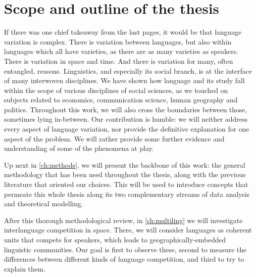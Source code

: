 \documentclass[../thesis.tex]{subfiles}
\begin{document}



\section{Scope and outline of the thesis}
If there was one chief takeaway from the last pages, it would be that language variation
is complex. There is variation between languages, but also within languages which all
have varieties, as there are as many varieties as speakers. There is variation in space
and time. And there is variation for many, often entangled, reasons. Linguistics, and
especially its social branch, is at the interface of many interwoven
disciplines. We have shown how language and its study fall within the scope of various
disciplines of social sciences, as we touched on subjects related to economics,
communication science, human geography and politics. Throughout this work, we will also
cross the boundaries between those, sometimes lying in-between. Our contribution is
humble: we will neither address every aspect of language variation,
nor provide the definitive explanation for one aspect of the problem. We will rather
provide some further evidence and understanding of some of the phenomena at play.

Up next in \cref{ch:methods}, we will present the backbone of this work: the general
methodology that has been used throughout the thesis, along with the previous literature
that oriented our choices. This will be used to introduce concepts that permeate this
whole thesis along its two complementary streams of data analysis and theoretical
modelling.

After this thorough methodological review, in \cref{ch:multiling} we will investigate
interlanguage competition in space. There, we will consider languages as coherent units
that compete for speakers, which leads to geographically-embedded linguistic
communities. Our goal is first to observe these, second to measure the differences
between different kinds of language competition, and third to try to explain them.
\end{document}
